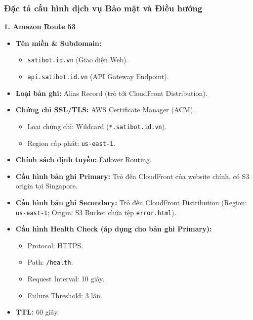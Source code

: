 \documentclass[a4paper,12pt]{article}
\newcommand{\code}[1]{\texttt{#1}}
\begin{document}
\subsubsection{Đặc tả cấu hình dịch vụ Bảo mật và Điều hướng}

\textbf{1. Amazon Route 53}
\begin{itemize}[leftmargin=*]
    \item \textbf{Tên miền \& Subdomain:} 
    \begin{itemize}[label=--]
        \item \code{satibot.id.vn} (Giao diện Web).
        \item \code{api.satibot.id.vn} (API Gateway Endpoint).
    \end{itemize}
    
    \item \textbf{Loại bản ghi:} Alias Record (trỏ tới CloudFront Distribution).
    
    \item \textbf{Chứng chỉ SSL/TLS:} AWS Certificate Manager (ACM).
    \begin{itemize}[label=--]
        \item Loại chứng chỉ: Wildcard (\code{*.satibot.id.vn}).
        \item Region cấp phát: \code{us-east-1}.
    \end{itemize}
     
    
    \item \textbf{Chính sách định tuyến:} Failover Routing.
    
    \item \textbf{Cấu hình bản ghi Primary:} Trỏ đến CloudFront của website chính, có S3 origin tại Singapore.
    
    \item \textbf{Cấu hình bản ghi Secondary:} Trỏ đến CloudFront Distribution (Region: \code{us-east-1}; Origin: S3 Bucket chứa tệp \code{error.html}).
    
    \item \textbf{Cấu hình Health Check (áp dụng cho bản ghi Primary):}
    \begin{itemize}[label=--]
        \item Protocol: HTTPS.
        \item Path: \code{/health}.
        \item Request Interval: 10 giây.
        \item Failure Threshold: 3 lần.
    \end{itemize}
    
    \item \textbf{TTL:} 60 giây.
\end{itemize}
\end{document}
